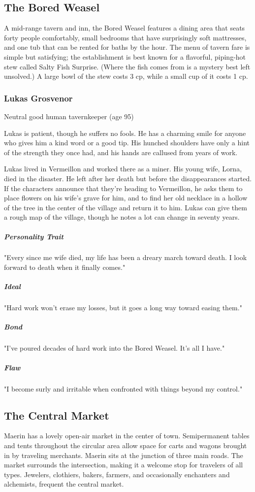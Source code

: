 \documentclass[10pt,a4paper,twoside,bg=print,twocolumn,openany,nodeprecatedcode]{dndbook}
\begin{document}
\subsection{The Bored Weasel}
A mid-range tavern and inn, the Bored Weasel features a dining area that seats forty people comfortably, small bedrooms that have surprisingly soft mattresses, and one tub that can be rented for baths by the hour. The menu of tavern fare is simple but satisfying; the establishment is best known for a flavorful, piping-hot stew called Salty Fish Surprise. (Where the fish comes from is a mystery best left unsolved.) A large bowl of the stew costs 3 cp, while a small cup of it costs 1 cp.

\subsubsection{Lukas Grosvenor}
Neutral good human tavernkeeper (age 95)

Lukas is patient, though he suffers no fools. He has a charming smile for anyone who gives him a kind word or a good tip. His hunched shoulders have only a hint of the strength they once had, and his hands are callused from years of work.

Lukas lived in Vermeillon and worked there as a miner. His young wife, Lorna, died in the disaster. He left after her death but before the disappearances started. If the characters announce that they're heading to Vermeillon, he asks them to place flowers on his wife's grave for him, and to find her old necklace in a hollow of the tree in the center of the village and return it to him. Lukas can give them a rough map of the village, though he notes a lot can change in seventy years.

\subparagraph{Personality Trait}
"Every since me wife died, my life has been a dreary march toward death. I look forward to death when it finally comes."

\subparagraph{Ideal}
"Hard work won't erase my losses, but it goes a long way toward easing them."

\subparagraph{Bond}
"I've poured decades of hard work into the Bored Weasel. It's all I have."

\subparagraph{Flaw}
"I become surly and irritable when confronted with things beyond my control."

\subsection{The Central Market}
Maerin has a lovely open-air market in the center of town. Semipermanent tables and tents throughout the circular area allow space for carts and wagons brought in by traveling merchants. Maerin sits at the junction of three main roads. The market surrounds the intersection, making it a welcome stop for travelers of all types. Jewelers, clothiers, bakers, farmers, and occasionally enchanters and alchemists, frequent the central market.
\end{document}
